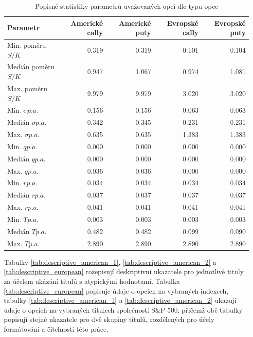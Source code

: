 \documentclass[male,czech,api_bc]{kitheses}
\begin{document}
  \begin{table}[h!]
    \centering
    \caption{Popisné statistiky parametrů uvažovaných opcí dle typu opce}
    \label{tab:descriptive_type}
\begin{tabular}{lrrrr}
      \toprule
      Parametr & Americké cally & Americké puty & Evropské cally & Evropské puty \\
      \midrule
      Min. poměru $S/K$ & 0.319 & 0.319 & 0.101 & 0.104 \\
      Medián poměru $S/K$ & 0.947 & 1.067 & 0.974 & 1.081 \\
      Max. poměru $S/K$ & 9.979 & 9.979 & 3.020 & 3.020 \\
      \midrule
      Min. $\sigma p.a.$ & 0.156 & 0.156 & 0.063 & 0.063 \\
      Medián $\sigma p.a.$ & 0.342 & 0.345 & 0.231 & 0.231 \\
      Max. $\sigma p.a.$ & 0.635 & 0.635 & 1.383 & 1.383 \\
      \midrule
      Min. $q p.a.$ & 0.000 & 0.000 & 0.000 & 0.000 \\
      Medián $q p.a.$ & 0.000 & 0.000 & 0.000 & 0.000 \\
      Max. $q p.a.$ & 0.036 & 0.036 & 0.000 & 0.000 \\
      \midrule
      Min. $r p.a.$ & 0.034 & 0.034 & 0.034 & 0.034 \\
      Medián $r p.a.$ & 0.037 & 0.037 & 0.037 & 0.037 \\
      Max. $r p.a.$ & 0.041 & 0.041 & 0.041 & 0.041 \\
      \midrule
      Min. $T p.a.$ & 0.003 & 0.003 & 0.003 & 0.003 \\
      Medián $T p.a.$ & 0.482 & 0.482 & 0.099 & 0.090 \\
      Max. $T p.a.$ & 2.890 & 2.890 & 2.890 & 2.890 \\
      \bottomrule
    \end{tabular}
  \end{table}

  Tabulky \ref{tab:descriptive_american_1}, \ref{tab:descriptive_american_2} a \ref{tab:descriptive_european} rozepisují deskriptivní ukazatele pro jednotlivé tituly za účelem ukázání titulů s atypickými hodnotami. Tabulka \ref{tab:descriptive_european} popisuje údaje o opcích na vybraných indexech, tabulky \ref{tab:descriptive_american_1} a \ref{tab:descriptive_american_2} ukazují údaje o opcích na vybraných titulech společností S\&P 500, přičemž obě tabulky popisují stejné ukazatele pro dvě skupiny titulů, rozdělených pro účely formátování a čitelnosti této práce.  
\end{document}
